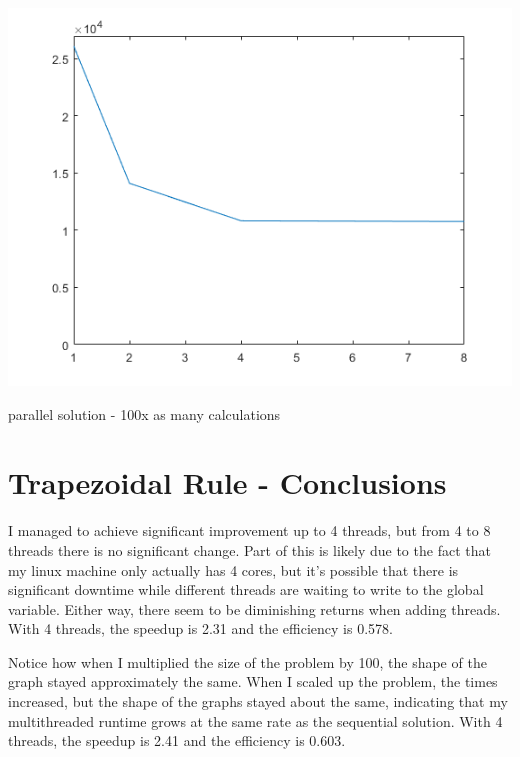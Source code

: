 \documentclass[a4paper]{article}
\begin{document}
\begin{center}
    \includegraphics[scale=1]{11c.png}
    \caption{parallel solution - 100x as many calculations}
\end{center}

\noindent


\section{Trapezoidal Rule - Conclusions}

I managed to achieve significant improvement up to 4 threads, but from 4 to 8 threads there is no significant change. Part of this is likely due to the fact that my linux machine only actually has 4 cores, but it's possible that there is significant downtime while different threads are waiting to write to the global variable. Either way, there seem to be diminishing returns when adding threads. With 4 threads, the speedup is 2.31 and the efficiency is 0.578.

Notice how when I multiplied the size of the problem by 100, the shape of the graph stayed approximately the same. When I scaled up the problem, the times increased, but the shape of the graphs stayed about the same, indicating that my multithreaded runtime grows at the same rate as the sequential solution. With 4 threads, the speedup is 2.41 and the efficiency is 0.603.
\end{document}

